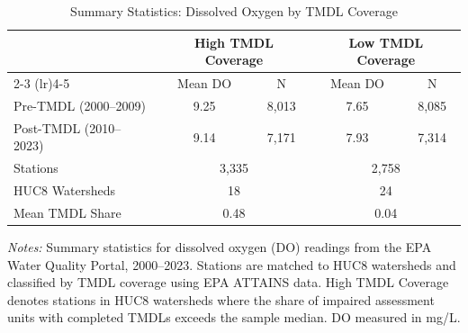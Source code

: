 \begin{table}[t]
\centering
\caption{Summary Statistics: Dissolved Oxygen by TMDL Coverage}
\label{tab:summary}
\begin{threeparttable}
\begin{tabular}{lcccc}
\toprule
 & \multicolumn{2}{c}{High TMDL Coverage} & \multicolumn{2}{c}{Low TMDL Coverage} \\
\cmidrule(lr){2-3} \cmidrule(lr){4-5}
 & Mean DO & N & Mean DO & N \\
\midrule
Pre-TMDL (2000--2009) & 9.25 & 8,013 & 7.65 & 8,085 \\
Post-TMDL (2010--2023) & 9.14 & 7,171 & 7.93 & 7,314 \\
\midrule
Stations & \multicolumn{2}{c}{3,335} & \multicolumn{2}{c}{2,758} \\
HUC8 Watersheds & \multicolumn{2}{c}{18} & \multicolumn{2}{c}{24} \\
Mean TMDL Share & \multicolumn{2}{c}{0.48} & \multicolumn{2}{c}{0.04} \\
\bottomrule
\end{tabular}
\begin{tablenotes}
\item \textit{Notes:} Summary statistics for dissolved oxygen (DO) readings from the EPA Water Quality Portal, 2000--2023. Stations are matched to HUC8 watersheds and classified by TMDL coverage using EPA ATTAINS data. High TMDL Coverage denotes stations in HUC8 watersheds where the share of impaired assessment units with completed TMDLs exceeds the sample median. DO measured in mg/L.
\end{tablenotes}
\end{threeparttable}
\end{table}

